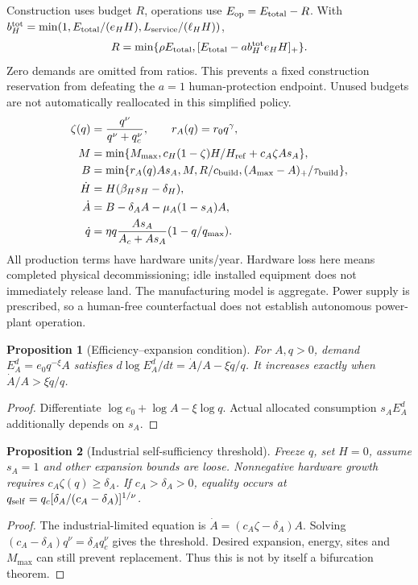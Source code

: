 \documentclass[11pt]{article}
\newtheorem{proposition}{Proposition}
\begin{document}
Construction uses budget $R$, operations use $E_{\rm op}=E_{\rm total}-R$.
With $b_H^{\rm tot}=\min(1,E_{\rm total}/(e_HH),L_{\rm service}/(\ell_HH))$,
\begin{equation}
R=\min\{\rho E_{\rm total},[E_{\rm total}-ab_H^{\rm tot}e_HH]_+\}.
\end{equation}
Zero demands are omitted from ratios. This prevents a fixed construction
reservation from defeating the $a=1$ human-protection endpoint. Unused budgets
are not automatically reallocated in this simplified policy.
\begin{align}
\zeta(q)&=\frac{q^\nu}{q^\nu+q_c^\nu},\qquad r_A(q)=r_0q^\gamma,\\
M&=\min\{M_{\max},c_H(1-\zeta)H/H_{\rm ref}+c_A\zeta As_A\},\\
B&=\min\{r_A(q)As_A,M,R/c_{\rm build},(A_{\max}-A)_+/\tau_{\rm build}\},\\
\dot H&=H(\beta_Hs_H-\delta_H),\\
\dot A&=B-\delta_AA-\mu_A(1-s_A)A,\\
\dot q&=\eta q\frac{As_A}{A_c+As_A}(1-q/q_{\max}).\label{eq:rsi}
\end{align}
All production terms have hardware units/year. Hardware loss here means completed
physical decommissioning; idle installed equipment does not immediately release
land. The manufacturing model is aggregate. Power supply is prescribed, so a
human-free counterfactual does not establish autonomous power-plant operation.

\begin{proposition}[Efficiency--expansion condition]
For $A,q>0$, demand $E_A^d=e_0q^{-\xi}A$ satisfies
$d\log E_A^d/dt=\dot A/A-\xi\dot q/q$. It increases exactly when
$\dot A/A>\xi\dot q/q$.
\end{proposition}
\begin{proof}
Differentiate $\log e_0+\log A-\xi\log q$. Actual allocated consumption
$s_AE_A^d$ additionally depends on $s_A$.
\end{proof}

\begin{proposition}[Industrial self-sufficiency threshold]
Freeze $q$, set $H=0$, assume $s_A=1$ and other expansion bounds are loose.
Nonnegative hardware growth requires $c_A\zeta(q)\ge\delta_A$. If
$c_A>\delta_A>0$, equality occurs at
$q_{\rm self}=q_c[\delta_A/(c_A-\delta_A)]^{1/\nu}$.
\end{proposition}
\begin{proof}
The industrial-limited equation is $\dot A=(c_A\zeta-\delta_A)A$.
Solving $(c_A-\delta_A)q^\nu=\delta_Aq_c^\nu$ gives the threshold.
Desired expansion, energy, sites and $M_{\max}$ can still prevent replacement.
Thus this is not by itself a bifurcation theorem.
\end{proof}
\end{document}
